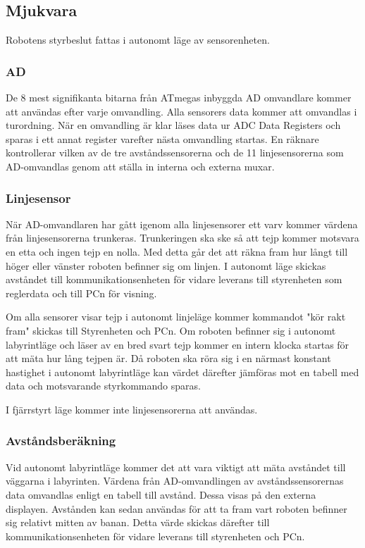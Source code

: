 \subsection{Mjukvara}
Robotens styrbeslut fattas i autonomt läge av sensorenheten.

\subsubsection{AD}
De 8 mest signifikanta bitarna från ATmegas inbyggda AD omvandlare kommer att användas efter varje omvandling. Alla sensorers data kommer att omvandlas i turordning. När en omvandling är klar läses data ur ADC Data Registers och sparas i ett annat register varefter nästa omvandling startas. En räknare kontrollerar vilken av de tre avståndssensorerna och de 11 linjesensorerna som AD-omvandlas genom att ställa in interna och externa muxar.

\subsubsection{Linjesensor}
När AD-omvandlaren har gått igenom alla linjesensorer ett varv kommer värdena från linjesensorerna trunkeras. Trunkeringen ska ske så att tejp kommer motsvara en etta och ingen tejp en nolla. Med detta går det att räkna fram hur långt till höger eller vänster roboten befinner sig om linjen. I autonomt läge skickas avståndet till kommunikationsenheten för vidare leverans till styrenheten som reglerdata och till PCn för visning.

Om alla sensorer visar tejp i autonomt linjeläge kommer kommandot "kör rakt fram" skickas till Styrenheten och PCn.
Om roboten befinner sig i autonomt labyrintläge och läser av en bred svart tejp kommer en intern klocka startas för att mäta hur lång tejpen är. Då roboten ska röra sig i en närmast konstant hastighet i autonomt labyrintläge kan värdet därefter jämföras mot en tabell med data och motsvarande styrkommando sparas. 

I fjärrstyrt läge kommer inte linjesensorerna att användas.

\subsubsection{Avståndsberäkning}
Vid autonomt labyrintläge kommer det att vara viktigt att mäta avståndet till väggarna i labyrinten.
Värdena från AD-omvandlingen av avståndssensorernas data omvandlas enligt en tabell till avstånd. Dessa visas på den externa displayen. Avstånden kan sedan användas för att ta fram vart roboten befinner sig relativt mitten av banan. Detta värde skickas därefter till kommunikationsenheten för vidare leverans till styrenheten och PCn.


